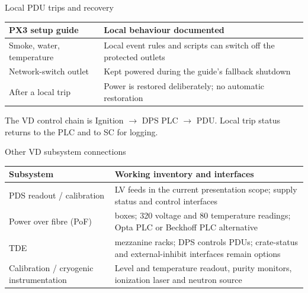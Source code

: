 \begin{frame}{Local PDU trips and recovery}
  \renewcommand{\arraystretch}{1.45}
  \begin{tabularx}{\textwidth}{@{}>{\RaggedRight\arraybackslash}p{3.7cm}>{\RaggedRight\arraybackslash}X@{}}
    \toprule
    \textbf{PX3 setup guide} & \textbf{Local behaviour documented}\\
    \midrule
    Smoke, water, temperature & Local event rules and scripts can switch off the protected outlets\\
    Network-switch outlet & Kept powered during the guide's fallback shutdown\\
    After a local trip & Power is restored deliberately; no automatic restoration\\
    \bottomrule
  \end{tabularx}\par
  \bigskip
  The VD control chain is Ignition $\rightarrow$ DPS PLC $\rightarrow$ PDU.
  Local trip status returns to the PLC and to SC for logging.
\end{frame}

\begin{frame}{Other VD subsystem connections}
  \renewcommand{\arraystretch}{1.35}
  \begin{tabularx}{\textwidth}{@{}>{\RaggedRight\arraybackslash}p{3.2cm}>{\RaggedRight\arraybackslash}X@{}}
    \toprule
    \textbf{Subsystem} & \textbf{Working inventory and interfaces}\\
    \midrule
    PDS readout / calibration & 34 LV feeds in the current presentation scope; supply status and control interfaces\\
    Power over fibre (PoF) & 80 boxes; 320 voltage and 80 temperature readings; Opta PLC or Beckhoff PLC alternative\\
    TDE & 20 mezzanine racks; DPS controls PDUs; crate-status and external-inhibit interfaces remain options\\
    Calibration / cryogenic instrumentation & Level and temperature readout, purity monitors, ionization laser and neutron source\\
    \bottomrule
  \end{tabularx}
\end{frame}


